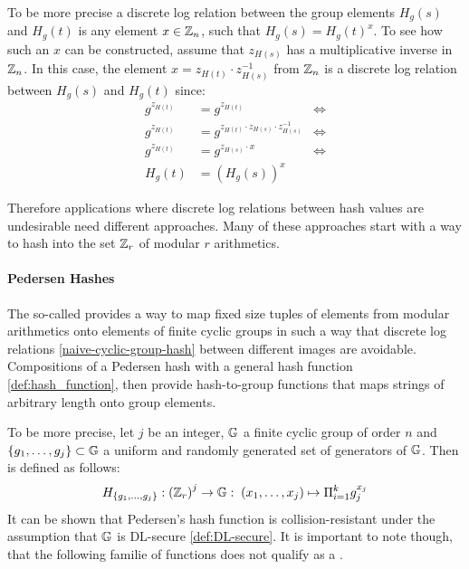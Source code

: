 \begin{example}
To be more precise a discrete log relation between the group elements $H_g(s)$ and $H_g(t)$ is any element $x\in \mathbb{Z}_n$, such that $H_g(s) = H_g(t)^x$. To see how such an $x$ can be constructed, assume that $z_{H(s)}$ has a multiplicative inverse in $\mathbb{Z}_n$. In this case, the element $x=z_{H(t)}\cdot z_{H(s)}^{-1}$ from $\mathbb{Z}_n$ is a discrete log relation between $H_g(s)$ and $H_g(t)$ since:
\begin{align*}
g^{z_{H(t)}} & = g^{z_{H(t)}} & \Leftrightarrow\\
g^{z_{H(t)}} & = g^{z_{H(t)}\cdot z_{H(s)}\cdot z_{H(s)}^{-1}} & \Leftrightarrow \\
g^{z_{H(t)}} & = g^{z_{H(s)}\cdot x} & \Leftrightarrow \\
H_g(t) & = (H_g(s))^x
\end{align*}
\end{example}
Therefore applications where discrete log relations between hash values are undesirable need different approaches. Many of these approaches start with a way to hash into the set $\mathbb{Z}_r$ of modular $r$ arithmetics.

\paragraph{Pedersen Hashes}
\label{def:Pedersen_hash}
The so-called  \citep{Pedersen92} provides a way to map fixed size tuples of elements from modular arithmetics onto elements of finite cyclic groups in such a way that discrete log relations \ref{naive-cyclic-group-hash} between different images are avoidable. Compositions of a Pedersen hash with a general hash function \ref{def:hash_function}, then provide hash-to-group functions that maps strings of arbitrary length onto group elements.

To be more precise, let $j$ be an integer, $\mathbb{G}$ a finite cyclic group of order $n$ and $\{g_1, \ldots, g_j\} \subset \mathbb{G}$ a uniform and randomly generated set of generators of $\mathbb{G}$. Then  is defined as follows:
\begin{equation}
H_{\{g_1,\ldots,g_j\}} : \left(\mathbb{Z}_r\right)^j \to \mathbb{G}:\; (x_1,\ldots,x_j)\mapsto \Pi_{i=1}^k g_j^{x_j}
\end{equation}
It can be shown that Pedersen’s  hash  function  is  collision-resistant under the assumption that $\mathbb{G}$ is DL-secure \ref{def:DL-secure}. It is important to note though, that the following familie of functions does not qualify as a .

